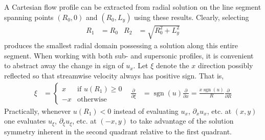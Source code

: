 \documentclass[letterpaper,11pt,nointlimits,reqno]{amsart}
\begin{document}
A Cartesian flow profile can be extracted from radial solution on the line
segment spanning points $\left(R_0,0\right)$ and $\left(R_0,L_y\right)$ using
these results.  Clearly, selecting
\begin{align}
  R_1 &= R_0
&
  R_2 &= \sqrt{R_0^2 + L_y^2}
\end{align}
produces the smallest radial domain possessing a solution along this entire
segment.  When working with both sub- and supersonic profiles, it is convenient
to abstract away the change in sign of $u_x$.  Let $\xi$ denote the $x$
direction possibly reflected so that streamwise velocity always has positive
sign.  That is,
\begin{align}
  \xi &= \begin{cases}  x &\mbox{if } u\!\left(R_1\right) \geq 0 \\
                       -x &\mbox{otherwise}
  \end{cases}
&
    \frac{\partial}{\partial\xi}
 &= \operatorname{sgn}(u) \frac{\partial}{\partial{}x}
  = \frac{x \operatorname{sgn}(u)}{R} \frac{\partial}{\partial{}R}
\end{align}
Practically, whenever $u\left(R_1\right) < 0$ instead of evaluating $u_x$,
$\partial_x u_x$, etc. at $\left(x,y\right)$ one evaluates $u_\xi$,
$\partial_\xi u_\xi$, etc. at $\left(-x,y\right)$ to take advantage of the
solution symmetry inherent in the second quadrant relative to the first
quadrant.
\end{document}
